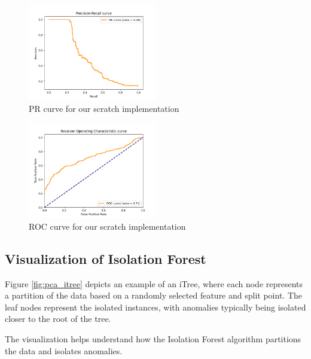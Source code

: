 \begin{figure}[htbp]
\centering
\includegraphics[width=0.5\textwidth]{resources/images/scratch_pr_curve.png}
\caption{PR curve for our scratch implementation}
\label{fig:scratch_pr}
\end{figure}

\begin{figure}[htbp]
\centering
\includegraphics[width=0.5\textwidth]{resources/images/scratch_roc_curve.png}
\caption{ROC curve for our scratch implementation}
\label{fig:scratch_roc}
\end{figure}

\subsection{Visualization of Isolation Forest}
Figure \ref{fig:pca_itree} depicts an example of an iTree, where each node represents a partition of the data based on a randomly selected feature and split point. The leaf nodes represent the isolated instances, with anomalies typically being isolated closer to the root of the tree.


The visualization helps understand how the Isolation Forest algorithm partitions the data and isolates anomalies.

